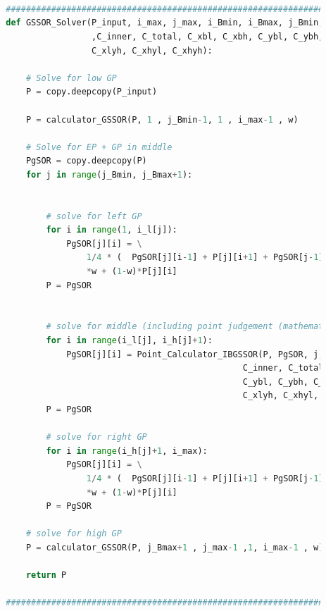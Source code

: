 \documentclass[12pt]{article}
\begin{document}
\begin{scriptsize}
\begin{lstlisting}[language=python,caption={Python code-Functions for iteration Calculator}]
        
        
        
        ##########################################################################################
        def GSSOR_Solver(P_input, i_max, j_max, i_Bmin, i_Bmax, j_Bmin, j_Bmax, i_l, i_h, w \
                         ,C_inner, C_total, C_xbl, C_xbh, C_ybl, C_ybh, C_edge, C_xlyl, \
                         C_xlyh, C_xhyl, C_xhyh):
        
            # Solve for low GP
            P = copy.deepcopy(P_input)
            
            P = calculator_GSSOR(P, 1 , j_Bmin-1, 1 , i_max-1 , w)
        
            # Solve for EP + GP in middle
            PgSOR = copy.deepcopy(P)
            for j in range(j_Bmin, j_Bmax+1):
        
        
                # solve for left GP
                for i in range(1, i_l[j]): 
                    PgSOR[j][i] = \
                        1/4 * (  PgSOR[j][i-1] + P[j][i+1] + PgSOR[j-1][i] + P[j+1][i] )\
                        *w + (1-w)*P[j][i]
                P = PgSOR
        
        
                # solve for middle (including point judgement (mathematically))
                for i in range(i_l[j], i_h[j]+1):
                    PgSOR[j][i] = Point_Calculator_IBGSSOR(P, PgSOR, j, i, w,\
                                                       C_inner, C_total, C_xbl, C_xbh, \
                                                       C_ybl, C_ybh, C_edge, C_xlyl, \
                                                       C_xlyh, C_xhyl, C_xhyh)
                P = PgSOR
                    
                # solve for right GP
                for i in range(i_h[j]+1, i_max):
                    PgSOR[j][i] = \
                        1/4 * (  PgSOR[j][i-1] + P[j][i+1] + PgSOR[j-1][i] + P[j+1][i] )\
                        *w + (1-w)*P[j][i]
                P = PgSOR
            
            # solve for high GP
            P = calculator_GSSOR(P, j_Bmax+1 , j_max-1 ,1, i_max-1 , w)
        
            return P
            
        ##########################################################################################
        
        
    \end{lstlisting}
\end{scriptsize}
\end{document}
